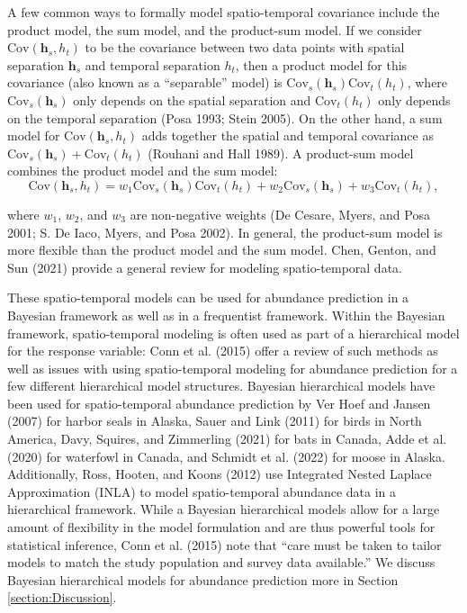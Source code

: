 \documentclass[smallextended]{svjour3}       %
\begin{document}
A few common ways to formally model spatio-temporal covariance include
the product model, the sum model, and the product-sum model. If we
consider \(\text{Cov}(\mathbf{h}_s, h_t)\) to be the covariance between
two data points with spatial separation \(\mathbf{h}_s\) and temporal
separation \(h_t\), then a product model for this covariance (also known
as a ``separable'' model) is
\(\text{Cov}_s(\mathbf{h}_s) \text{Cov}_t(h_t)\), where
\(\text{Cov}_s(\mathbf{h}_s)\) only depends on the spatial separation
and \(\text{Cov}_t(h_t)\) only depends on the temporal separation (Posa
1993; Stein 2005). On the other hand, a sum model for
\(\text{Cov}(\mathbf{h}_s, h_t)\) adds together the spatial and temporal
covariance as \(\text{Cov}_s(\mathbf{h}_s) + \text{Cov}_t(h_t)\)
(Rouhani and Hall 1989). A product-sum model combines the product model
and the sum model: \mbox{} \begin{equation}
\text{Cov}(\mathbf{h}_s, h_t) = w_1\text{Cov}_s(\mathbf{h}_s) \text{Cov}_t(h_t) + w_2\text{Cov}_s(\mathbf{h}_s) + w_3\text{Cov}_t(h_t),
\end{equation}

\noindent where \(w_1\), \(w_2\), and \(w_3\) are non-negative weights
(De Cesare, Myers, and Posa 2001; S. De Iaco, Myers, and Posa 2002). In
general, the product-sum model is more flexible than the product model
and the sum model. Chen, Genton, and Sun (2021) provide a general review
for modeling spatio-temporal data.

These spatio-temporal models can be used for abundance prediction in a
Bayesian framework as well as in a frequentist framework. Within the
Bayesian framework, spatio-temporal modeling is often used as part of a
hierarchical model for the response variable: Conn et al. (2015) offer a
review of such methods as well as issues with using spatio-temporal
modeling for abundance prediction for a few different hierarchical model
structures. Bayesian hierarchical models have been used for
spatio-temporal abundance prediction by Ver Hoef and Jansen (2007) for
harbor seals in Alaska, Sauer and Link (2011) for birds in North
America, Davy, Squires, and Zimmerling (2021) for bats in Canada, Adde
et al. (2020) for waterfowl in Canada, and Schmidt et al. (2022) for
moose in Alaska. Additionally, Ross, Hooten, and Koons (2012) use
Integrated Nested Laplace Approximation (INLA) to model spatio-temporal
abundance data in a hierarchical framework. While a Bayesian
hierarchical models allow for a large amount of flexibility in the model
formulation and are thus powerful tools for statistical inference, Conn
et al. (2015) note that ``care must be taken to tailor models to match
the study population and survey data available.'' We discuss Bayesian
hierarchical models for abundance prediction more in Section
\ref{section:Discussion}.
\end{document}

